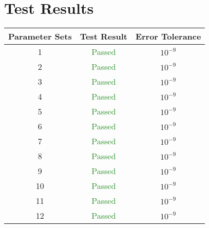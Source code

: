\documentclass[]{BasiliskReportMemo}
\begin{document}
\section{Test Results}

\begin{center}
\begin{tabular}{|c|c|c|}
\hline
Parameter Sets & Test Result & Error Tolerance \\ \hline \hline
1  & \textcolor{ForestGreen}{Passed} & $10^{-9}$ \\ \hline
2  & \textcolor{ForestGreen}{Passed} & $10^{-9}$ \\ \hline
3  & \textcolor{ForestGreen}{Passed} & $10^{-9}$ \\ \hline
4  & \textcolor{ForestGreen}{Passed} & $10^{-9}$ \\ \hline
5  &\textcolor{ForestGreen}{Passed}& $10^{-9}$ \\ \hline
6  & \textcolor{ForestGreen}{Passed} & $10^{-9}$ \\ \hline
7  & \textcolor{ForestGreen}{Passed} & $10^{-9}$ \\ \hline
8  & \textcolor{ForestGreen}{Passed} & $10^{-9}$ \\ \hline
9  & \textcolor{ForestGreen}{Passed} & $10^{-9}$ \\ \hline
10  &\textcolor{ForestGreen}{Passed}& $10^{-9}$ \\ \hline
11  & \textcolor{ForestGreen}{Passed} & $10^{-9}$ \\ \hline
12  &\textcolor{ForestGreen}{Passed} & $10^{-9}$ \\ 
\hline

\end{tabular}
\end{center}
\end{document}
